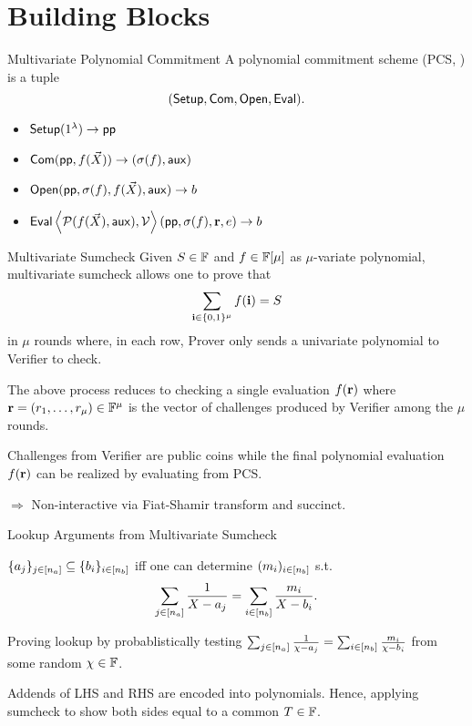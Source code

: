 \section{Building Blocks}
\begin{frame}{Multivariate Polynomial Commitment}
	A polynomial commitment scheme (PCS, \cite{AC:KatZavGol10}) is a tuple $$(\mathsf{Setup}, \mathsf{Com}, \mathsf{Open}, \mathsf{Eval}).$$
	\begin{itemize}
		\item $ \mathsf{Setup}(1^\lambda)\to\mathsf{pp}$
		\item $\mathsf{Com}(\mathsf{pp}, f(\vec{X}))\to(\sigma(f), \mathsf{aux})$
		\item $\mathsf{Open}(\mathsf{pp}, \sigma(f), f(\vec{X}), \mathsf{aux})\to b$
		\item $ \mathsf{Eval} \left\langle\mathcal{P}( f(\vec{X}), \mathsf{aux} ),\mathcal{V}\right\rangle (\mathsf{pp}, \sigma(f), \mathbf{r}, e)\to b$
	\end{itemize}
\end{frame}
\begin{frame}{Multivariate Sumcheck}
	Given $S \in \mathbb{F}$ and $f \in \mathbb{F}[\mu]$ as $\mu$-variate polynomial, multivariate sumcheck \cite{FOCS:LundFKN90} allows one to prove that 
	\begin{equation*}
		\sum_{\mathbf{i} \in \{0,1\}^\mu} f(\mathbf{i}) = S
	\end{equation*} 
	in $\mu$ rounds where, in each row, Prover only sends a univariate polynomial to Verifier to check.
	
	The above process reduces to checking a single evaluation $f(\mathbf{r})$ where $\mathbf{r} = (r_1, \dots, r_\mu) \in \mathbb{F}^\mu$ is the vector of challenges produced by Verifier among the $\mu$ rounds.
	
	Challenges from Verifier are public coins while the final polynomial evaluation $f(\mathbf{r})$ can be realized by evaluating from PCS.
	
	$\Rightarrow$ Non-interactive via Fiat-Shamir transform \cite{CRYPTO:FiaSha86} and succinct.
\end{frame}

\begin{frame}{Lookup Arguments from Multivariate Sumcheck}
	\begin{lemma}
		$\{a_j\}_{j \in [{n_a}]} \subseteq \{b_i\}_{i \in [{n_b}]}$ iff one can determine $(m_i)_{i \in [{n_b}]}$ s.t.
		\begin{equation*}
			\sum_{j \in [{n_a}]}\frac{1}{X - a_j} = \sum_{i \in [{n_b}]}\frac{m_i}{X - b_i}.
		\end{equation*}
	\end{lemma}
	
	Proving lookup by probablistically testing $\sum_{j \in [{n_a}]}\frac{1}{\chi - a_j} = \sum_{i \in [{n_b}]}\frac{m_i}{\chi - b_i}$ from some random $\chi \in \mathbb{F}$.
	
	Addends of LHS and RHS are encoded into polynomials. Hence, applying sumcheck to show both sides equal to a common $T \in \mathbb{F}$.
\end{frame}